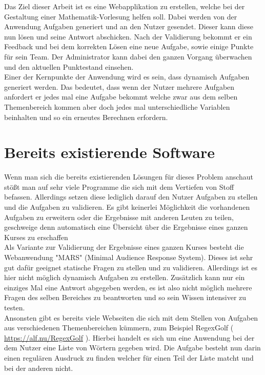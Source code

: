 Das Ziel dieser Arbeit ist es eine Webapplikation zu erstellen, welche bei der Gestaltung einer Mathematik-Vorlesung helfen soll. Dabei werden von der Anwendung Aufgaben generiert und an den Nutzer gesendet. Dieser kann diese nun lösen und seine Antwort abschicken. Nach der Validierung bekommt er ein Feedback und bei dem korrekten Lösen eine neue Aufgabe, sowie einige Punkte für sein Team. Der Administrator kann dabei den ganzen Vorgang überwachen und den aktuellen Punktestand einsehen. \\
Einer der Kernpunkte der Anwendung wird es sein, dass dynamisch Aufgaben generiert werden. Das bedeutet, dass wenn der Nutzer mehrere Aufgaben anfordert er jedes mal eine Aufgabe bekommt welche zwar aus dem selben Themenbereich kommen aber doch jedes mal unterschiedliche Variablen beinhalten und so ein erneutes Berechnen erfordern.


\section{Bereits existierende Software}

Wenn man sich die bereits existierenden Lösungen für dieses Problem anschaut stößt man auf sehr viele Programme die sich mit dem Vertiefen von Stoff befassen. Allerdings setzen diese lediglich darauf den Nutzer Aufgaben zu stellen und die Aufgaben zu validieren. Es gibt keinerlei Möglichkeit die vorhandenen Aufgaben zu erweitern oder die Ergebnisse mit anderen Leuten zu teilen, geschweige denn automatisch eine Übersicht über die Ergebnisse eines ganzen Kurses zu erschaffen \\

Als Variante zur Validierung der Ergebnisse eines ganzen Kurses besteht die Webanwendung "MARS" (Minimal Audience Response System). Dieses ist sehr gut dafür geeignet statische Fragen zu stellen und zu validieren. Allerdings ist es hier nicht möglich dynamisch Aufgaben zu erstellen. Zusätzlich kann nur ein einziges Mal eine Antwort abgegeben werden, es ist also nicht möglich mehrere Fragen des selben Bereiches zu beantworten und so sein Wissen intensiver zu testen. \\

Ansonsten gibt es bereits viele Webseiten die sich mit dem Stellen von Aufgaben aus verschiedenen Themenbereichen kümmern, zum Beispiel RegexGolf ( \url{https://alf.nu/RegexGolf} ). Hierbei handelt es sich um eine Anwendung bei der dem Nutzer eine Liste von Wörtern gegeben wird. Die Aufgabe besteht nun darin einen regulären Ausdruck zu finden welcher für einen Teil der Liste matcht und bei der anderen nicht.

